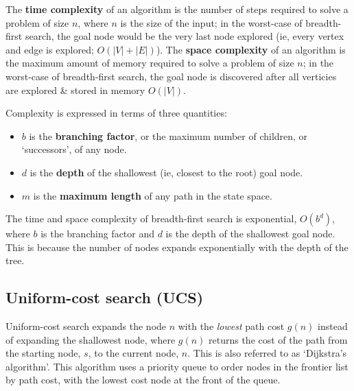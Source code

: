 \begin{definition}
    The \textbf{time complexity} of an algorithm is the number of steps required to solve a problem of size $n$, where $n$ is the size of the input; in the worst-case of breadth-first search, the goal node would be the very last node explored (ie, every vertex and edge is explored; $O(|V| + |E|)$). The \textbf{space complexity} of an algorithm is the maximum amount of memory required to solve a problem of size $n$; in the worst-case of breadth-first search, the goal node is discovered after all verticies are explored \& stored in memory $O(|V|)$.
\end{definition}

\begin{definition}
    Complexity is expressed in terms of three quantities:
    \begin{itemize}
        \item $b$ is the \textbf{branching factor}, or the maximum number of children, or `successors', of any node.
        \item $d$ is the \textbf{depth} of the shallowest (ie, closest to the root) goal node.
        \item $m$ is the \textbf{maximum length} of any path in the state space.
    \end{itemize}
\end{definition}

The time and space complexity of breadth-first search is exponential, $O(b^{d})$, where $b$ is the branching factor and $d$ is the depth of the shallowest goal node. This is because the number of nodes expands exponentially with the depth of the tree.

\subsection{Uniform-cost search (UCS)}
\label{sub_sec:uniform_cost_search}

Uniform-cost search expands the node $n$ with the \emph{lowest} path cost $g(n)$ instead of expanding the shallowest node, where $g(n)$ returns the cost of the path from the starting node, $s$, to the current node, $n$. This is also referred to as `Dijkstra's algorithm'. This algorithm uses a priority queue to order nodes in the frontier list by path cost, with the lowest cost node at the front of the queue.


